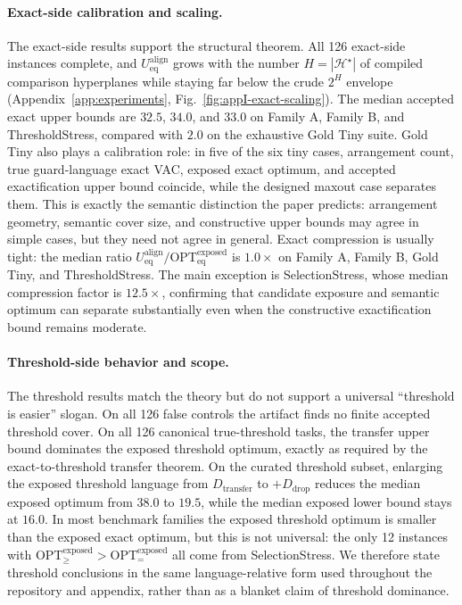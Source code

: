 \documentclass{article}
\begin{document}
\paragraph{Exact-side calibration and scaling.}
The exact-side results support the structural theorem. All 126 exact-side instances complete, and $U_{\mathrm{eq}}^{\mathrm{align}}$ grows with the number $H=|\mathcal H^\star|$ of compiled comparison hyperplanes while staying far below the crude $2^H$ envelope (Appendix~\ref{app:experiments}, Fig.~\ref{fig:appI-exact-scaling}). The median accepted exact upper bounds are $32.5$, $34.0$, and $33.0$ on Family A, Family B, and ThresholdStress, compared with $2.0$ on the exhaustive Gold Tiny suite. Gold Tiny also plays a calibration role: in five of the six tiny cases, arrangement count, true guard-language exact VAC, exposed exact optimum, and accepted exactification upper bound coincide, while the designed maxout case separates them. This is exactly the semantic distinction the paper predicts: arrangement geometry, semantic cover size, and constructive upper bounds may agree in simple cases, but they need not agree in general. Exact compression is usually tight: the median ratio $U_{\mathrm{eq}}^{\mathrm{align}} / \mathrm{OPT}_{\mathrm{eq}}^{\mathrm{exposed}}$ is $1.0\times$ on Family A, Family B, Gold Tiny, and ThresholdStress. The main exception is SelectionStress, whose median compression factor is $12.5\times$, confirming that candidate exposure and semantic optimum can separate substantially even when the constructive exactification bound remains moderate.

\paragraph{Threshold-side behavior and scope.}
The threshold results match the theory but do not support a universal ``threshold is easier'' slogan. On all 126 false controls the artifact finds no finite accepted threshold cover. On all 126 canonical true-threshold tasks, the transfer upper bound dominates the exposed threshold optimum, exactly as required by the exact-to-threshold transfer theorem. On the curated threshold subset, enlarging the exposed threshold language from $D_{\mathrm{transfer}}$ to $+D_{\mathrm{drop}}$ reduces the median exposed optimum from $38.0$ to $19.5$, while the median exposed lower bound stays at $16.0$. In most benchmark families the exposed threshold optimum is smaller than the exposed exact optimum, but this is not universal: the only 12 instances with $\mathrm{OPT}_{\ge}^{\mathrm{exposed}} > \mathrm{OPT}_{=}^{\mathrm{exposed}}$ all come from SelectionStress. We therefore state threshold conclusions in the same language-relative form used throughout the repository and appendix, rather than as a blanket claim of threshold dominance.
\end{document}
